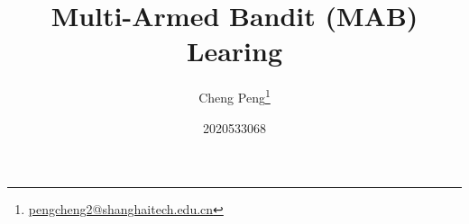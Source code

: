 \documentclass{article}
\begin{document}
\title{Multi-Armed Bandit (MAB) Learing}
\author{Cheng Peng\footnote{\href{mailto:pengcheng2@shanghaitech.edu.cn}{pengcheng2@shanghaitech.edu.cn}}\and 2020533068}
\maketitle
\tableofcontents
\newpage

\newpage
\appendix
\printbibliography[
	heading=bibintoc,
	title={reference}
]
\end{document}
